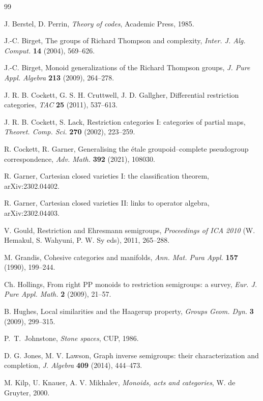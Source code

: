 \documentclass[a4paper]{amsart}
\begin{document}
\begin{thebibliography}{99}

 J. Berstel, D. Perrin, {\em Theory of codes}, Academic Press, 1985.

 J.-C. Birget, The groups of Richard Thompson and complexity, {\em Inter. J. Alg. Comput.} {\bf 14} (2004), 569--626.

 J.-C. Birget, Monoid generalizations of the Richard Thompson groups, {\em J. Pure Appl. Algebra} {\bf 213} (2009), 264--278.

 J. R. B. Cockett, G. S. H. Cruttwell, J. D. Gallgher, Differential restriction categories, {\em TAC} {\bf 25} (2011), 537--613.

 J. R. B. Cockett, S. Lack, Restriction categories I: categories of partial maps, 
{\em Theoret. Comp. Sci.} {\bf 270} (2002), 223--259.

 R. Cockett, R. Garner, Generalising the \'etale groupoid--complete pseudogroup correspondence, {\em Adv. Math.} {\bf 392} (2021), 108030.

 R. Garner, Cartesian closed varieties I: the classification theorem, arXiv:2302.04402.

 R. Garner, Cartesian closed varieties II: links to operator algebra, arXiv:2302.04403.

 V. Gould, Restriction and Ehresmann semigroups, {\em Proceedings of ICA 2010} (W. Hemakul, S. Wahyuni, P. W. Sy eds), 2011, 265--288.

 M. Grandis, Cohesive categories and manifolds, {\em Ann. Mat. Pura Appl.} {\bf 157} (1990), 199--244.

 Ch. Hollings, From right PP monoids to restriction semigroups: a survey, 
{\em Eur. J. Pure Appl. Math.} {\bf 2} (2009), 21--57.

 B. Hughes, Local similarities and the Haagerup property, {\em Groups Geom. Dyn.} {\bf 3} (2009), 299--315.

 P.~T.~Johnstone, {\em Stone spaces}, CUP, 1986.

 D. G. Jones, M. V. Lawson, Graph inverse semigroups: their characterization and completion, {\em J. Algebra} {\bf 409} (2014), 444--473.

 M. Kilp, U. Knauer, A. V. Mikhalev, {\em Monoids, acts and categories},  W. de Gruyter, 2000.


\end{thebibliography}
\end{document}
